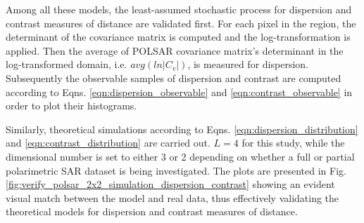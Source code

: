 \documentclass[journal]{IEEEtran}
\begin{document}
Among all these models, the least-assumed stochastic process for dispersion and contrast measures of distance are validated first.
For each pixel in the region, the determinant of the covariance matrix is computed and the log-transformation is applied.
Then the average of POLSAR covariance matrix’s determinant in the log-transformed domain, i.e. $avg(ln|C_v|)$, is measured for dispersion.
Subsequently the observable samples of dispersion and contrast are computed according to Eqns. \ref{eqn:dispersion_observable} and \ref{eqn:contrast_observable} in order to plot their histograms.

Similarly, theoretical simulations according to Eqns. \ref{eqn:dispersion_distribution} and \ref{eqn:contrast_distribution} are carried out. $L=4$ for this study, while the dimensional number is set to either 3 or 2 depending on whether a full or partial polarimetric SAR dataset is being investigated.
The plots are presented in Fig. 
\ref {fig:verify_polsar_2x2_simulation_dispersion_contrast} showing an evident visual match between the model and real data, thus effectively validating the theoretical models for dispersion and contrast measures of distance.
\end{document}
